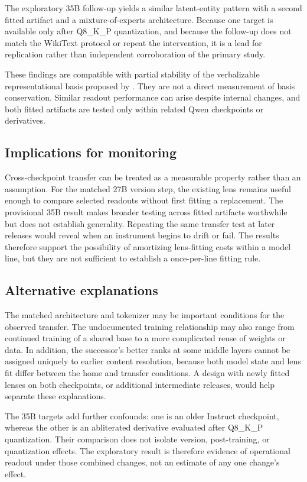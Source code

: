 \documentclass[10pt,a4paper,twocolumn]{article}
\begin{document}
The exploratory 35B follow-up yields a similar latent-entity pattern with a
second fitted artifact and a mixture-of-experts architecture. Because one
target is available only after Q8\_K\_P quantization, and because the
follow-up does not match the WikiText protocol or repeat the intervention,
it is a lead for replication rather than independent corroboration of the
primary study.

These findings are compatible with partial stability of the verbalizable
representational basis proposed by \citet{gurnee2026workspace}. They are not a
direct measurement of basis conservation. Similar readout performance can
arise despite internal changes, and both fitted artifacts are tested only
within related Qwen checkpoints or derivatives.

\subsection{Implications for monitoring}

Cross-checkpoint transfer can be treated as a measurable property rather than
an assumption. For the matched 27B version step, the existing lens remains
useful enough to compare selected readouts without first fitting a
replacement. The provisional 35B result makes broader testing across fitted
artifacts worthwhile but does not establish generality. Repeating the same
transfer test at later releases would reveal when an instrument begins to
drift or fail. The results therefore support the possibility of amortizing
lens-fitting costs within a model line, but they are not sufficient to
establish a once-per-line fitting rule.

\subsection{Alternative explanations}

The matched architecture and tokenizer may be important conditions for the
observed transfer. The undocumented training relationship may also range from
continued training of a shared base to a more complicated reuse of weights or
data. In addition, the successor's better ranks at some middle layers cannot
be assigned uniquely to earlier content resolution, because both model state
and lens fit differ between the home and transfer conditions. A design with
newly fitted lenses on both checkpoints, or additional intermediate releases,
would help separate these explanations.

The 35B targets add further confounds: one is an older Instruct checkpoint,
whereas the other is an abliterated derivative evaluated after Q8\_K\_P
quantization. Their comparison does not isolate version, post-training, or
quantization effects. The exploratory result is therefore evidence of
operational readout under those combined changes, not an estimate of any one
change's effect.
\end{document}
